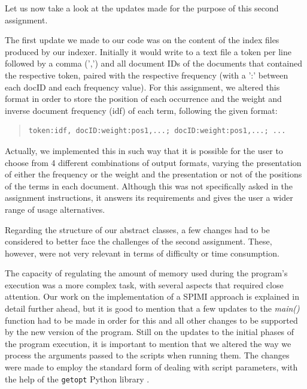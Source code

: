 \documentclass[12pt]{article}
\begin{document}
Let us now take a look at the updates made for the purpose of this second 
assignment.

The first update we made to our code was on the content of the index files 
produced by our indexer. Initially it would write to a text file a token
per line followed by a comma (',') and all document IDs of the documents that
contained the respective token, paired with the respective frequency (with
a ':' between each docID and each frequency value).
For this assignment, we altered this format in order to store the position
of each occurrence and the weight and inverse document frequency (idf) of 
each term, following the given format:

\begingroup
\addtolength\leftmargini{-0.4in}
\begin{quote}
\begin{verbatim}
token:idf, docID:weight:pos1,...; docID:weight:pos1,...; ...
\end{verbatim}
\end{quote}
\endgroup

Actually, we implemented this in such way that it is possible for the user
to choose from 4 different combinations of output formats, varying the 
presentation of either the frequency or the weight and the presentation or
not of the positions of the terms in each document.
Although this was not specifically asked in the assignment instructions,
it answers its requirements and gives the user a wider range of usage 
alternatives.

Regarding the structure of our abstract classes, a few changes had to be
considered to better face the challenges of the second assignment.
These, however, were not very relevant in terms of difficulty or time
consumption.

The capacity of regulating the amount of memory used during the program's
execution was a more complex task, with several aspects that required close
attention. Our work on the implementation of a SPIMI approach is explained
in detail further ahead, but it is good to mention that a few updates to 
the {\it main()\/} function had to be made in order for this and all other 
changes to be supported by the new version of the program.
Still on the updates to the initial phases of the program execution, it is
important to mention that we altered the way we process the arguments passed
to the scripts when running them. The changes were made to employ the standard
form of dealing with script parameters, with the help of the \texttt{getopt}
Python library \cite{getopt}.
\end{document}
